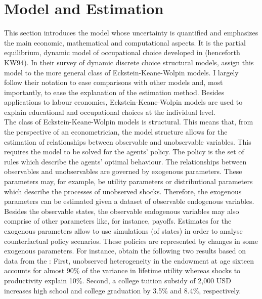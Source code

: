 \documentclass[a4paper,12pt]{article}
\begin{document}
\newpage %

\section{Model and Estimation}
\thispagestyle{plain} %
This section introduces the model whose uncertainty is quantified and emphasizes the main economic, mathematical and computational aspects. It is the partial equilibrium, dynamic model of occupational choice developed in \cite{Keane.1994} (henceforth KW94). In their survey of dynamic discrete choice structural models, \cite{Aguirregabiria.2010} assign this model to the more general class of Eckstein-Keane-Wolpin models. I largely follow their notation to ease comparisons with other models and, most importantly, to ease the explanation of the estimation method. Besides applications to labour economics, Eckstein-Keane-Wolpin models are used to explain educational and occupational choices at the individual level. \\
\newline
The class of Eckstein-Keane-Wolpin models is structural. This means that, from the perspective of an econometrician, the model structure allows for the estimation of relationships between observable and unobservable variables. This requires the model to be solved for the agents' policy. The policy is the set of rules which describe the agents' optimal behaviour. The relationships between observables and unobservables are governed by exogenous parameters. These parameters may, for example, be utility parameters or distributional parameters which describe the processes of unobserved shocks. Therefore, the exogenous parameters can be estimated given a dataset of observable endogenous variables. Besides the observable states, the observable endogenous variables may also comprise of other parameters like, for instance, payoffs. Estimates for the exogenous parameters allow to use simulations (of states) in order to analyse counterfactual policy scenarios. These policies are represented by changes in some exogenous parameters. For instance, \cite{Keane.1997} obtain the following two results based on data from the : First, unobserved heterogeneity in the endowment at age sixteen accounts for almost 90\% of the variance in lifetime utility whereas shocks to productivity explain 10\%. Second, a college tuition subsidy of 2,000 USD increases high school and college graduation by 3.5\% and 8.4\%, respectively.\\
\end{document}
